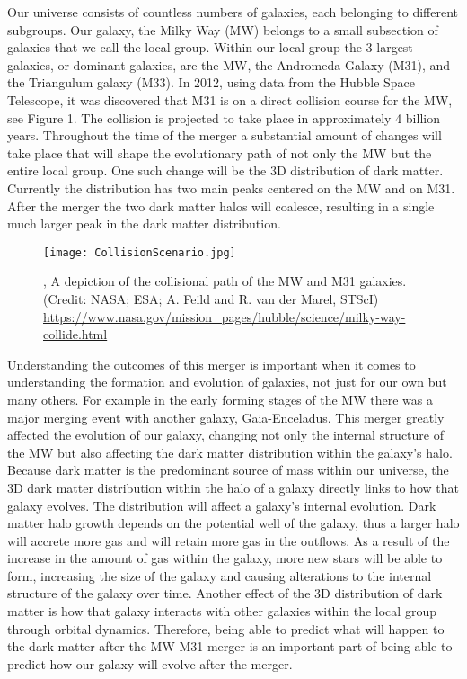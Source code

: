 \documentclass{aastex63}
\begin{document}
Our universe consists of countless numbers of galaxies, each belonging to different subgroups. Our galaxy, the Milky Way (MW) belongs to a small subsection of galaxies that we call the local group. Within our local group the 3 largest galaxies, or dominant galaxies, are the MW, the Andromeda Galaxy (M31), and the Triangulum galaxy (M33). In 2012, using data from the Hubble Space Telescope, it was discovered that M31 is on a direct collision course for the MW, see Figure 1. The collision is projected to take place in approximately 4 billion years. \cite{Dunbar_2012} Throughout the time of the merger a substantial amount of changes will take place that will shape the evolutionary path of not only the MW but the entire local group. One such change will be the 3D distribution of dark matter. Currently the distribution has two main peaks centered on the MW and on M31. After the merger the two dark matter halos will coalesce, resulting in a single much larger peak in the dark matter distribution.

\begin{figure}[ht!]
\begin{center}
\texttt{[image: CollisionScenario.jpg]}
\caption{\label{fig:1}, A depiction of the collisional path of the MW and M31 galaxies.  (Credit: NASA; ESA; A. Feild and R. van der Marel, STScI) \url{https://www.nasa.gov/mission_pages/hubble/science/milky-way-collide.html} }
\end{center}
\end{figure}

Understanding the outcomes of this merger is important when it comes to understanding the formation and evolution of galaxies, not just for our own but many others. For example in the early forming stages of the MW there was a major merging event with another galaxy, Gaia-Enceladus. This merger greatly affected the evolution of our galaxy, changing not only the internal structure of the MW but also affecting the dark matter distribution within the galaxy's halo.\cite{Helmi_2018} Because dark matter is the predominant source of mass within our universe, the 3D dark matter distribution within the halo of a galaxy directly links to how that galaxy evolves. The distribution will affect a galaxy's internal evolution. Dark matter halo growth depends on the potential well of the galaxy, thus a larger halo will accrete more gas and will retain more gas in the outflows. As a result of the increase in the amount of gas within the galaxy, more new stars will be able to form, increasing the size of the galaxy and causing alterations to the internal structure of the galaxy over time. Another effect of the 3D distribution of dark matter is how that galaxy interacts with other galaxies within the local group through orbital dynamics.\cite{Wechsler_2018} Therefore, being able to predict what will happen to the dark matter after the MW-M31 merger is an important part of being able to predict how our galaxy will evolve after the merger.
\end{document}
